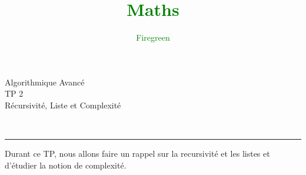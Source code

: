 \documentclass[11pt]{extarticle}
\author{\textcolor{Green}{Firegreen}}
\title{\textcolor{Green}{\textbf{Maths}}}
\begin{document}
\begin{minipage}[t]{0.35\paperwidth}
\begin{flushleft}
\end{flushleft}
\end{minipage}
\begin{minipage}[t]{0.35\paperwidth}
\begin{flushright}
\noindent \Huge{Algorithmique Avancé} \\
\noindent \LARGE{TP 2} \\
\noindent \Large{Récursivité, Liste et Complexité}
\end{flushright}
\end{minipage}\\
\begin{center}
\rule{\textwidth}{0.2cm}
\end{center}
\vspace{1cm}
Durant ce TP, nous allons faire un rappel sur la recursivité et les listes et d'étudier la notion de complexité.
\end{document}
